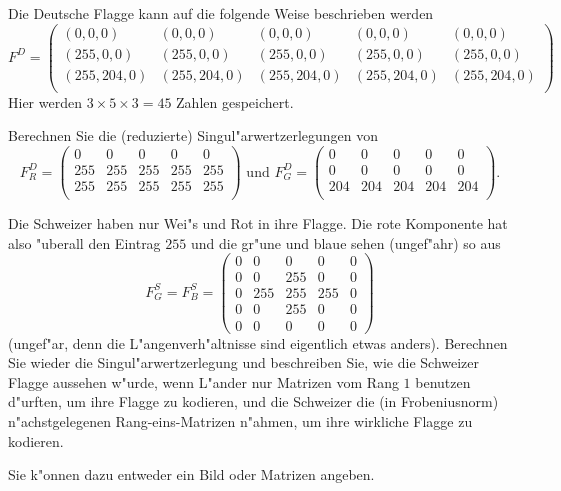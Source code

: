 \documentclass[a4,11pt]{article}
\begin{document}
\vspace*{-17mm}
{
\kopf
}



\begin{aufgabe}[4 Punkte]
Die Deutsche Flagge kann auf die folgende Weise beschrieben werden
\[
F^D = \begin{pmatrix}
(0,0,0) & (0,0,0) & (0,0,0) & (0,0,0) & (0,0,0) \\
(255,0,0) & (255,0,0) & (255,0,0) & (255,0,0) & (255,0,0) \\
(255,204,0) & (255,204,0) & (255,204,0) & (255,204,0) & (255,204,0) \\
\end{pmatrix}
\]
Hier werden $3 \times 5 \times 3 = 45$ Zahlen gespeichert.

Berechnen Sie die (reduzierte) Singul"arwertzerlegungen von
\[
F^D_R = \begin{pmatrix}
0 & 0 & 0 & 0 & 0 \\
255 & 255 & 255 & 255 & 255 \\
255 & 255 & 255 &255 & 255 \\
\end{pmatrix}
\text{ und }
F^D_G = \begin{pmatrix}
0 & 0 & 0 & 0 & 0 \\
0 & 0 & 0 & 0 & 0 \\
204 & 204 & 204 &204 & 204 \\
\end{pmatrix}.
\]

Die Schweizer haben nur Wei"s und Rot in ihre Flagge. Die rote
Komponente hat also "uberall den Eintrag $255$ und die gr"une und
blaue sehen (ungef"ahr) so aus
\[
F^S_G = F^S_B = \begin{pmatrix}
0 & 0 & 0 & 0 & 0 \\
0 & 0 & 255 & 0 & 0 \\
0 & 255 & 255 & 255 & 0 \\
0 & 0 & 255 & 0 & 0 \\
0 & 0 & 0 & 0 & 0
\end{pmatrix}
\]
(ungef"ar, denn die L"angenverh"altnisse sind eigentlich etwas anders).
Berechnen Sie wieder die Singul"arwertzerlegung und beschreiben Sie,
wie die Schweizer Flagge aussehen w"urde, wenn L"ander nur Matrizen
vom Rang $1$ benutzen d"urften, um ihre Flagge zu kodieren, und die
Schweizer die (in Frobeniusnorm) n"achstgelegenen Rang-eins-Matrizen
n"ahmen, um ihre wirkliche Flagge zu kodieren.

Sie k"onnen dazu entweder ein Bild oder Matrizen angeben.
\end{aufgabe}
\end{document}
